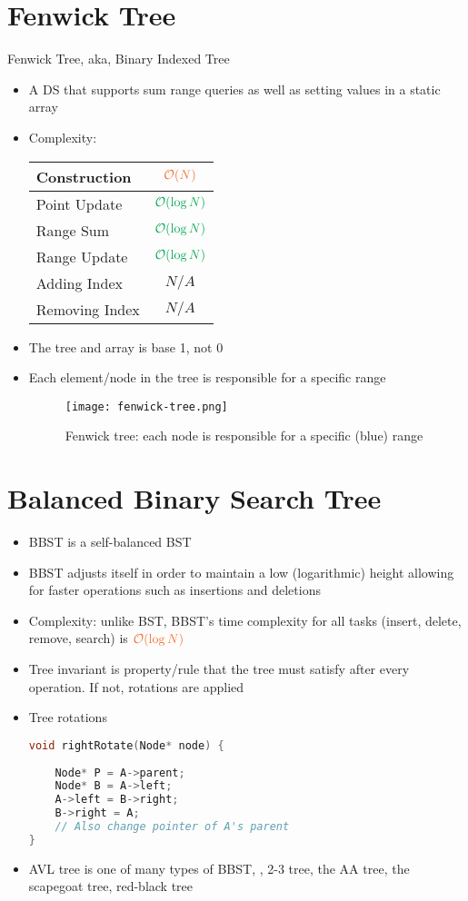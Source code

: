\section{Fenwick Tree}
Fenwick Tree, \ac{aka}, Binary Indexed Tree
\begin{itemize}
	\item A \ac{DS} that supports sum range queries as well as setting values in a static array
	\item Complexity:
	\begin{center}
		\begin{tabular}{|l|c|}
			\hline
			Construction & $ \color{Orange} \mathcal{O}(N) $ \\ \hline
			Point Update & $ \color{Green} \mathcal{O} (\log N) $ \\ \hline
			Range Sum & $ \color{Green} \mathcal{O} (\log N) $ \\ \hline
			Range Update & $ \color{Green} \mathcal{O} (\log N) $ \\ \hline
			Adding Index & \color{Red} $ N/A $ \\ \hline
			Removing Index & \color{Red} $ N/A $ \\ \hline
		\end{tabular}
	\end{center}
	\item The tree and array is base 1, not 0
	\item Each element/node in the tree is responsible for a specific range
	\begin{figure}[hbt!]
		\centering
		\texttt{[image: fenwick-tree.png]}
		\caption{Fenwick tree: each node is responsible for a specific (blue) range}
	\end{figure}
\end{itemize}

\section{Balanced Binary Search Tree}
\begin{itemize}
	\item \ac{BBST} is a self-balanced \ac{BST}
	\item \ac{BBST} adjusts itself in order to maintain a low (logarithmic) height allowing for faster operations such as insertions and deletions
	\item Complexity: unlike \ac{BST}, \ac{BBST}'s time complexity for all tasks (insert, delete, remove, search) is $ \color{Orange} \mathcal{O}(\log N) $
	\item Tree invariant is property/rule that the tree must satisfy after every operation. If not, rotations are applied
	\item Tree rotations
\begin{lstlisting}[language=C++]
void rightRotate(Node* node) {
	
	Node* P = A->parent;
	Node* B = A->left;
	A->left = B->right;
	B->right = A;
	// Also change pointer of A's parent
}
\end{lstlisting}
	\item AVL tree is one of many types of \ac{BBST}, \eg, 2-3 tree, the AA tree, the scapegoat tree, red-black tree
\end{itemize}

